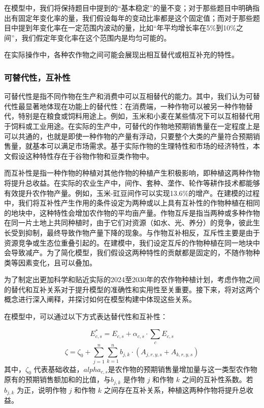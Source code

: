 \documentclass{cumcmthesis}
\begin{document}
在模型中，我们将保持题目中提到的“基本稳定”的量不变；对于那些题目中明确指出有固定年变化率的量，我们假设每年的变动比率都是这个固定值；而对于那些题目中提到年变化率在一定范围内波动的量，比如“年平均增长率在5\%到10\%之间”，我们假定年变化率在这个范围内是均匀可能的。

在实际操作中，各种农作物之间可能会展现出相互替代或相互补充的特性。
\subsubsection{可替代性，互补性}
可替代性是指不同作物在生产和消费中可以互相替代的能力。其中，我们认为可替代性最显著地体现在功能上的替代性：在消费端，一种作物可以被另一种作物替代，特别是在粮食或饲料用途上。例如，玉米和小麦在某些情况下可以互相替代用于饲料或工业用途。在实际的生产中，可替代的作物地预期销售量在一定程度上是可以共通的，也就是即使一种作物的产量有浮动，只要整个大类的产量符合预期销售量，就基本可以满足市场需求。基于实际作物的生理特性和市场的经济特性，本文假设这种特性存在于谷物作物\cite{ref4}和豆类作物\cite{ref5}中。
  
而互补性是指一种作物的种植对其他作物的种植产生积极影响，即种植这两种作物将提升总收益。在实际的农业生产中，间作、套种、垄作、轮作等耕作技术都能够有效提升农作物产量。例如，玉米-豇豆间作可以实现13.6\%\cite{ref6}的增产。在建模的过程中，我们将互补性产生作用的条件设定为两种或以上具有互补性的作物种植在相同的地块中，这种特性会增加农作物的平均亩产量。作物互斥是指当两种或多种作物在同一片土地上共同种植时，由于它们对资源（如水、光、养分）的竞争，彼此生长受到抑制，最终导致作物产量下降的现象。与作物互补相反，互斥性主要是由于资源竞争或生态位重叠引起的。在建模中，我们设定互斥的作物种植在同一地块中会导致减产。为了简化模型，我们假设这两种特性的贡献都是固定的，不随作物种类等因素变化，且可以叠加。

为了制定出更加科学和贴近实际的2024至2030年的农作物种植计划，考虑作物之间的替代和互补关系对于提升模型的准确性和实用性至关重要。接下来，将对这两个概念进行深入阐释，并探讨如何在模型构建中体现这些关系。

在模型中，可以通过以下方式表达替代性和互补性：

\begin{equation}
E^*_{c,s} = E_{c,s}   + \alpha_{c,s} \cdot \sum_{c} E_{c,s}
\end{equation}
\begin{equation}
    \zeta = \zeta_0 + \sum_{j=1}^{n} \sum_{k=1}^{n} b_{j,k} \cdot (A_{j,r,y,s} + A_{k,r,y,s})
\end{equation}
    其中，$\zeta_0$ 代表基础收益，$alpha_{c,s}$是农作物的预期销售量增加量与这一类型农作物原有的预期销售额加和的比值，与$b_{j,k}$ 是作物 $j$ 和作物 $k$ 之间的互补性系数。若 $b_{j,k}$ 为正，说明作物 $j$ 和作物 $k$ 之间存在互补关系，种植这两种作物将提升总收益。
\end{document}
